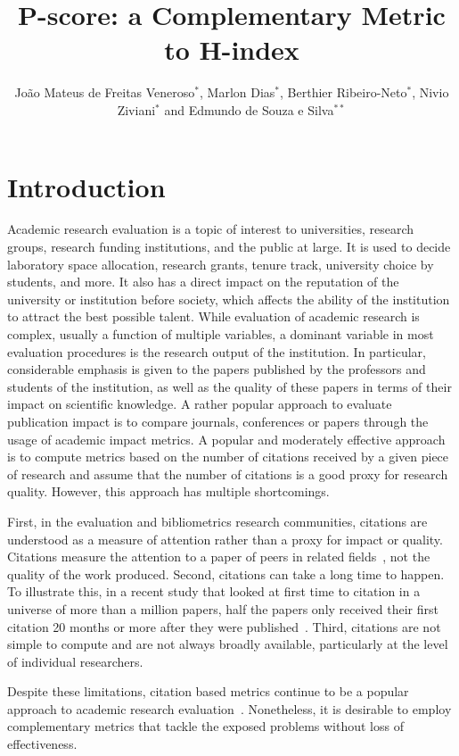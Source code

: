 \documentclass[man]{apa6}
\title{P-score: a Complementary Metric to H-index}
\author{
João Mateus de Freitas Veneroso${^*}$, 
Marlon Dias${^*}$, 
Berthier Ribeiro-Neto${^*}$,
Nivio Ziviani${^*}$ and 
Edmundo de Souza e Silva${^{**}}$ 
}
\affiliation{${^*}$Universidade Federal de Minas Gerais and ${^{**}}$Universidade Federal do Rio de Janeiro}
\let \cite \parencite
\begin{document}
\setlength{\parindent}{40pt}

\maketitle

\section{Introduction}
\label{sec:introduction}

Academic research evaluation is a topic of interest to universities, research groups,
research funding institutions, and the public at large. It is used to decide laboratory space
allocation, research grants, tenure track, university choice by students, and more. It also 
has a direct impact on the reputation of the university or institution before society, which
affects the ability of the institution to attract the best possible talent. While evaluation of
academic research is complex, usually a function of multiple variables, a dominant variable in
most evaluation procedures is the research output of the institution. In particular, considerable
emphasis is given to the papers published by the professors and students of the institution, as
well as the quality of these papers in terms of their impact on scientific knowledge. A rather
popular approach to evaluate publication impact is to compare journals, conferences or papers
through the usage of academic impact metrics. A popular and moderately effective approach is to
compute metrics based on the number of citations received by a given piece of research and
assume that the number of citations is a good proxy for research quality. However,
this approach has multiple shortcomings. 

First, in the evaluation and bibliometrics research communities, citations are understood
as a measure of attention rather than a proxy for impact or quality. Citations measure 
the attention to a paper of peers in related fields~\cite{Loach2015}, not the quality of the 
work produced. Second, citations can take a long time to happen. To illustrate this, in a recent
study that looked at first time to citation in a universe of more than a million papers, half the 
papers only received their first citation 20 months or more after they were
published~\cite{Nane2012}. Third, citations are not simple to compute and are not always broadly
available, particularly at the level of individual researchers.

Despite these limitations, citation based metrics continue to be a popular approach to
academic research evaluation~\cite{Kellner2008}.
Nonetheless, it is desirable to employ
complementary metrics that tackle the exposed problems without loss of effectiveness.
\end{document}
